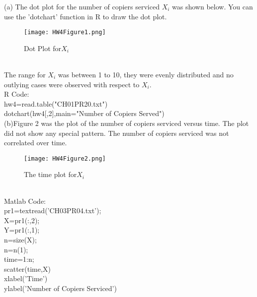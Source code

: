 \documentclass[12pt]{article}
\begin{document}
 { \vfill
  \answer
} { 
(a) The dot plot for the number of copiers serviced $X_i$ was shown below. You can use the 'dotchart' function in R to draw the dot plot. \\
\begin{figure}[h!]
\centering
\graphicspath{{c:/users/qun/desktop/}}
\texttt{[image: HW4Figure1.png]}
\caption{Dot Plot for$X_i$}
\end{figure}\\
The range for $X_i$ was between 1 to 10, they were evenly distributed and no outlying cases were observed with respect to $X_i$.\\
R Code:\\
hw4=read.table("CH01PR20.txt")\\
dotchart(hw4[,2],main="Number of Copiers Served")\\

(b)Figure 2 was the plot of the number of copiers serviced versus time. The plot did not show any special pattern. The number of copiers serviced was not correlated over time. \\
\begin{figure}[h!]
\centering
\graphicspath{{c:/users/qun/desktop/}}
\texttt{[image: HW4Figure2.png]}
\caption{The time plot for$X_i$}
\end{figure}
 }\\
Matlab Code:\\
pr1=textread('CH03PR04.txt');\\
X=pr1(:,2);\\
Y=pr1(:,1);\\
n=size(X);\\
n=n(1);\\
time=1:n;\\
scatter(time,X)\\
xlabel('Time')\\
ylabel('Number of Copiers Serviced')\\
\end{document}
